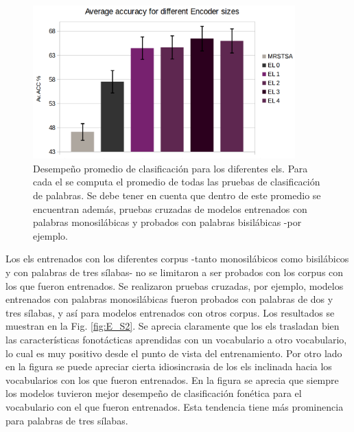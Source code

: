 \begin{figure}[h!]
    \centering
    \includegraphics[width=0.9\textwidth]{Encoder_Swept1.png}
    \caption{Desempe\~no promedio de clasificación para los diferentes \glspl{el}. Para cada \gls{el} se computa el promedio de todas las pruebas de clasificación de palabras. Se debe tener en cuenta que dentro de este promedio se encuentran además, pruebas cruzadas de modelos entrenados con palabras monosilábicas y probados con palabras bisilábicas -por ejemplo.}
    \label{fig:E_S1}
\end{figure}

Los \glspl{el} entrenados con los diferentes corpus -tanto monosilábicos como bisilábicos y con palabras de tres sílabas- no se limitaron a ser probados con los corpus con los que fueron entrenados. Se realizaron pruebas cruzadas, por ejemplo, modelos entrenados con palabras monosilábicas fueron probados con palabras de dos y tres sílabas, y así para modelos entrenados con otros corpus. Los resultados se muestran en la Fig. \ref{fig:E_S2}. Se aprecia claramente que los \glspl{el} trasladan bien las características fonotácticas aprendidas con un vocabulario a otro vocabulario, lo cual es muy positivo desde el punto de vista del entrenamiento. Por otro lado en la figura se puede apreciar cierta idiosincrasia de los \glspl{el} inclinada hacia los vocabularios con los que fueron entrenados. En la figura se aprecia que siempre los modelos tuvieron mejor desempeño de clasificación fonética para el vocabulario con el que fueron entrenados. Esta tendencia tiene más prominencia para palabras de tres sílabas.

